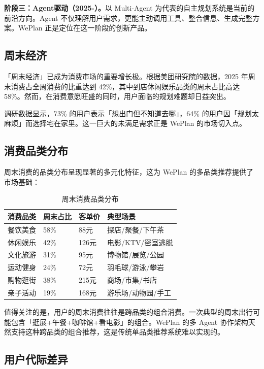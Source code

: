 \documentclass[12pt,a4paper]{ctexart}
\begin{document}
\textbf{阶段三：Agent驱动（2025-）。}以 Multi-Agent 为代表的自主规划系统是当前的前沿方向。Agent 不仅理解用户需求，更能主动调用工具、整合信息、生成完整方案。WePlan 正是定位在这一阶段的创新产品。

\subsection{周末经济}

「周末经济」已成为消费市场的重要增长极。根据美团研究院的数据，2025 年周末消费占全周消费的比重达到 42\%，其中到店休闲娱乐品类的周末占比高达 58\%。然而，在消费意愿旺盛的同时，用户面临的规划难题却日益突出。

调研数据显示，73\% 的用户表示「想出门但不知道去哪」，64\% 的用户因「规划太麻烦」而选择宅在家里。这一巨大的未满足需求正是 WePlan 的市场切入点。

\subsection{消费品类分布}

周末消费的品类分布呈现显著的多元化特征，这为 WePlan 的多品类推荐提供了市场基础：

\begin{table}[H]
\centering
\caption{周末消费品类分布}
\label{tab:category-dist}
\renewcommand{\arraystretch}{1.3}
\begin{tabular}{p{3cm} p{2.5cm} p{2.5cm} p{4cm}}
\toprule
\textbf{消费品类} & \textbf{周末占比} & \textbf{客单价} & \textbf{典型场景} \\
\midrule
餐饮美食 & 58\% & 88元 & 探店/聚餐/下午茶 \\
休闲娱乐 & 42\% & 126元 & 电影/KTV/密室逃脱 \\
文化旅游 & 31\% & 95元 & 博物馆/展览/公园 \\
运动健身 & 24\% & 72元 & 羽毛球/游泳/攀岩 \\
购物逛街 & 38\% & 215元 & 商场/市集/书店 \\
亲子活动 & 19\% & 168元 & 游乐场/动物园/手工 \\
\bottomrule
\end{tabular}
\end{table}

值得关注的是，用户的周末消费往往是跨品类的组合消费。一次典型的周末出行可能包含「逛展+午餐+咖啡馆+看电影」的组合。WePlan 的多 Agent 协作架构天然支持这种跨品类的组合推荐，这是传统单品类推荐系统难以实现的。

\subsection{用户代际差异}
\end{document}
